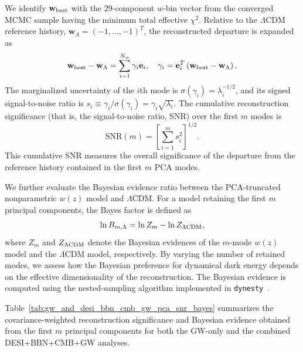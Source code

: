 \documentclass[
  aps,
  prd,
  twocolumn,
  nofootinbib,
  superscriptaddress,
  floatfix,
  longbibliography
]{revtex4-2}
\newcommand{\LCDM}{\ensuremath{\Lambda\mathrm{CDM}}}
\begin{document}
We identify $\mathbf{w}_{\rm best}$ with the 29-component $w$-bin vector
from the converged MCMC sample having the minimum total effective $\chi^2$.
Relative to the $\LCDM$ reference history,
$\mathbf{w}_{\Lambda}=(-1,\ldots,-1)^T$, the reconstructed departure is
expanded as
\begin{equation}
 \mathbf{w}_{\rm best}-\mathbf{w}_{\Lambda}
 =
 \sum_{i=1}^{N_w}\gamma_i\mathbf{e}_i,
 \quad
 \gamma_i
 =
 \mathbf{e}_i^T
 \left(
 \mathbf{w}_{\rm best}-\mathbf{w}_{\Lambda}
 \right).
 \label{eq:pca_mode_amplitudes}
\end{equation}
The marginalized uncertainty of the $i$th mode is
$\sigma(\gamma_i)=\lambda_i^{-1/2}$, and its signed signal-to-noise ratio is
$s_i\equiv\gamma_i/\sigma(\gamma_i)=\gamma_i\sqrt{\lambda_i}$. The
cumulative reconstruction significance (that is, the signal-to-noise ratio, SNR)
over the first $m$ modes is
\begin{equation}
 \mathrm{SNR}(m)
 =
 \left[
 \sum_{i=1}^{m}s_i^2
 \right]^{1/2}.
 \label{eq:cumulative_snr}
\end{equation}
This cumulative SNR measures the overall significance of the departure from
the reference history contained in the first $m$ PCA modes.

We further evaluate the Bayesian evidence ratio between the
PCA-truncated nonparametric $w(z)$ model and $\Lambda$CDM. For a
model retaining the first $m$ principal components, the Bayes factor
is defined as
\begin{equation}
\ln B_{m,\Lambda}
=
\ln Z_{m}
-
\ln Z_{\Lambda{\rm CDM}},
\end{equation}
where $Z_m$ and $Z_{\Lambda{\rm CDM}}$ denote the Bayesian evidences
of the $m$-mode $w(z)$ model and the $\Lambda$CDM model, respectively.
By varying the number of retained modes, we assess how the Bayesian
preference for dynamical dark energy depends on the effective
dimensionality of the reconstruction. The Bayesian evidence is
computed using the nested-sampling algorithm implemented in
\texttt{dynesty}~\cite{Speagle2020}.







Table~\ref{tab:gw_and_desi_bbn_cmb_gw_pca_snr_bayes} summarizes the covariance-weighted
reconstruction significance and Bayesian evidence obtained from the first
$m$ principal components for both the GW-only and the combined
DESI+BBN+CMB+GW analyses.
\end{document}
